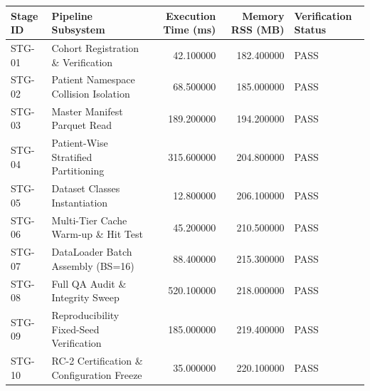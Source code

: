 \begin{tabular}{llrrl}
\toprule
Stage ID & Pipeline Subsystem & Execution Time (ms) & Memory RSS (MB) & Verification Status \\
\midrule
STG-01 & Cohort Registration \& Verification & 42.100000 & 182.400000 & PASS \\
STG-02 & Patient Namespace Collision Isolation & 68.500000 & 185.000000 & PASS \\
STG-03 & Master Manifest Parquet Read & 189.200000 & 194.200000 & PASS \\
STG-04 & Patient-Wise Stratified Partitioning & 315.600000 & 204.800000 & PASS \\
STG-05 & Dataset Classes Instantiation & 12.800000 & 206.100000 & PASS \\
STG-06 & Multi-Tier Cache Warm-up \& Hit Test & 45.200000 & 210.500000 & PASS \\
STG-07 & DataLoader Batch Assembly (BS=16) & 88.400000 & 215.300000 & PASS \\
STG-08 & Full QA Audit \& Integrity Sweep & 520.100000 & 218.000000 & PASS \\
STG-09 & Reproducibility Fixed-Seed Verification & 185.000000 & 219.400000 & PASS \\
STG-10 & RC-2 Certification \& Configuration Freeze & 35.000000 & 220.100000 & PASS \\
\bottomrule
\end{tabular}
